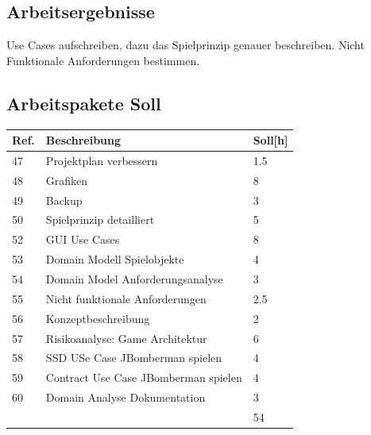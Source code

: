 \documentclass[11pt]{scrartcl}
\begin{document}
\subsection{Arbeitsergebnisse}
Use Cases aufschreiben, dazu das Spielprinzip genauer beschreiben. 
Nicht Funktionale Anforderungen bestimmen.
\subsection{Arbeitspakete Soll}
  \begin{tabularx} {\linewidth}{lXl}
    \bf{Ref.}  & \bf{Beschreibung} & \bf{Soll[h]} \\
    \hline
    47 & Projektplan verbessern & 1.5 \\
    48 & Grafiken & 8 \\
    49 &  Backup & 3 \\
    50 & Spielprinzip detailliert & 5 \\
    52 &  GUI Use Cases & 8 \\
    53 & Domain Modell Spielobjekte & 4\\
    54 & Domain Model Anforderungsanalyse & 3\\
    55 & Nicht funktionale Anforderungen & 2.5 \\
    56 & Konzeptbeschreibung & 2 \\
    57 & Risikoanalyse: Game Architektur  & 6 \\
    58 & SSD USe Case JBomberman spielen & 4 \\
    59 & Contract Use Case JBomberman spielen & 4\\
    60 & 	Domain Analyse Dokumentation & 3 \\
    \hline
    & & 54
  \end{tabularx}
  
\end{document}
